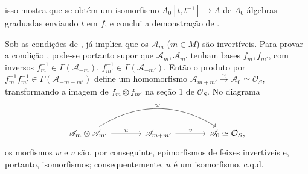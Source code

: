 
isso mostra que se obtém um isomorfismo
\(A_0[t,t^{-1}]\to A\) de \(A_0\)-álgebras graduadas
enviando \(t\) em \(f\), e conclui a demonstração de
.

Sob as condições de
,
 já implica
que os \(\mathscr A_m\) (\(m\in M\)) são invertíveis.
Para provar a condição
,
pode-se portanto supor que \(\mathscr A_m,\mathscr A_{m'}\)
tenham bases \(f_m,f_{m'}\), com inversos
\(f_m^{-1}\in\Gamma(\mathscr A_{-m})\),
\(f_{m'}^{-1}\in\Gamma(\mathscr A_{-m'})\).
Então o produto por
\(f_m^{-1}f_{m'}^{-1}\in\Gamma(\mathscr A_{-m-m'})\)
define um homomorfismo
\(\mathscr A_{m+m'}\xrightarrow{\sim}\mathscr A_0
\simeq\mathcal O_S\), transformando a imagem de
\(f_m\otimes f_{m'}\) na seção 1 de \(\mathcal O_S\).
No diagrama
\[
\begin{tikzcd}[column sep=large]
  \mathscr A_m\otimes\mathscr A_{m'}
    \arrow[r,"u"]
    \arrow[rr,bend left=32,"w"]
  & \mathscr A_{m+m'}
    \arrow[r,"v"]
  & \mathscr A_0\simeq\mathcal O_S ,
\end{tikzcd}
\]
os morfismos \(w\) e \(v\) são, por conseguinte, epimorfismos de feixes
invertíveis e, portanto, isomorfismos; consequentemente, \(u\) é um
isomorfismo, c.q.d.
